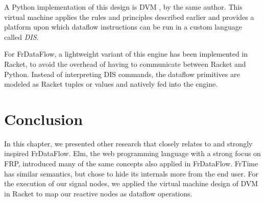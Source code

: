 A Python implementation of this design is DVM \citep{saey_towards_2014}, by the same author. This virtual machine applies the rules and principles described earlier and provides a platform upon which dataflow instructions can be run in a custom language called \textit{DIS}. 

For FrDataFlow, a lightweight variant of this engine has been implemented in Racket, to avoid the overhead of having to communicate between Racket and Python. Instead of interpreting DIS commands, the dataflow primitives are modeled as Racket tuples or values and natively fed into the engine.

\section{Conclusion}

In this chapter, we presented other research that closely relates to and strongly inspired FrDataFlow. Elm, the web programming language with a strong focus on FRP, introduced many of the same concepts also applied in FrDataFlow. FrTime has similar semantics, but chose to hide its internals more from the end user. For the execution of our signal nodes, we applied the virtual machine design of DVM in Racket to map our reactive nodes as dataflow operations. 





